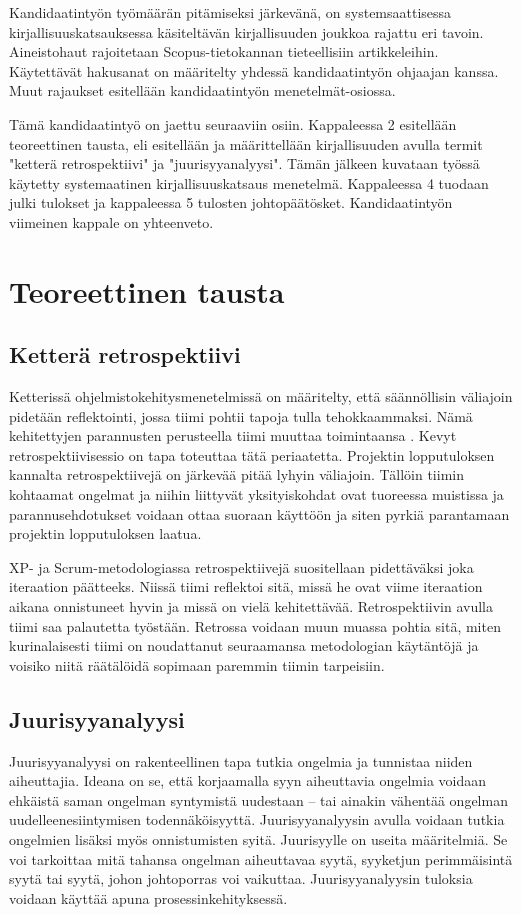Kandidaatintyön työmäärän pitämiseksi järkevänä, on systemsaattisessa kirjallisuuskatsauksessa käsiteltävän kirjallisuuden joukkoa rajattu eri tavoin. Aineistohaut rajoitetaan Scopus-tietokannan tieteellisiin artikkeleihin. Käytettävät hakusanat on määritelty yhdessä kandidaatintyön ohjaajan kanssa. Muut rajaukset esitellään kandidaatintyön menetelmät-osiossa.

Tämä kandidaatintyö on jaettu seuraaviin osiin. Kappaleessa 2 esitellään teoreettinen tausta, eli esitellään ja määrittellään kirjallisuuden avulla termit "ketterä retrospektiivi" ja "juurisyyanalyysi". Tämän jälkeen kuvataan työssä käytetty systemaatinen kirjallisuuskatsaus menetelmä. Kappaleessa 4 tuodaan julki tulokset ja kappaleessa 5 tulosten johtopäätösket. Kandidaatintyön viimeinen kappale on yhteenveto.

\section{Teoreettinen tausta}
\subsection{Ketterä retrospektiivi}
Ketterissä ohjelmistokehitysmenetelmissä on määritelty, että säännöllisin väliajoin pidetään reflektointi, jossa tiimi pohtii tapoja tulla tehokkaammaksi. Nämä kehitettyjen parannusten perusteella tiimi muuttaa toimintaansa \citep{AgileManifestoPrinciples}. Kevyt retrospektiivisessio on tapa toteuttaa tätä periaatetta. Projektin lopputuloksen kannalta retrospektiivejä on järkevää pitää lyhyin väliajoin. Tällöin tiimin kohtaamat ongelmat ja niihin liittyvät yksityiskohdat ovat tuoreessa muistissa ja parannusehdotukset voidaan ottaa suoraan käyttöön ja siten pyrkiä parantamaan projektin lopputuloksen laatua. \citep{Cockburn2002}

XP- ja Scrum-metodologiassa retrospektiivejä suositellaan pidettäväksi joka iteraation päätteeks. Niissä tiimi reflektoi sitä, missä he ovat viime iteraation aikana onnistuneet hyvin ja missä on vielä kehitettävää. \citep{Lindstrom2004, ScrumGuide2011} Retrospektiivin avulla tiimi saa palautetta työstään. Retrossa voidaan muun muassa pohtia sitä, miten kurinalaisesti tiimi on noudattanut seuraamansa metodologian käytäntöjä ja voisiko niitä räätälöidä sopimaan paremmin tiimin tarpeisiin. \citep{Lindstrom2004}

\subsection{Juurisyyanalyysi}
Juurisyyanalyysi on rakenteellinen tapa tutkia ongelmia ja tunnistaa niiden aiheuttajia. Ideana on se, että korjaamalla syyn aiheuttavia ongelmia voidaan ehkäistä saman ongelman syntymistä uudestaan -- tai ainakin vähentää ongelman uudelleenesiintymisen todennäköisyyttä. \citep{Lehtinen2011} Juurisyyanalyysin avulla voidaan tutkia ongelmien lisäksi myös onnistumisten syitä. \citep{Bjornson2009} Juurisyylle on useita määritelmiä. Se voi tarkoittaa mitä tahansa ongelman aiheuttavaa syytä, syyketjun perimmäisintä syytä tai syytä, johon johtoporras voi vaikuttaa. Juurisyyanalyysin tuloksia voidaan käyttää apuna prosessinkehityksessä. \citep{Lehtinen2011}

